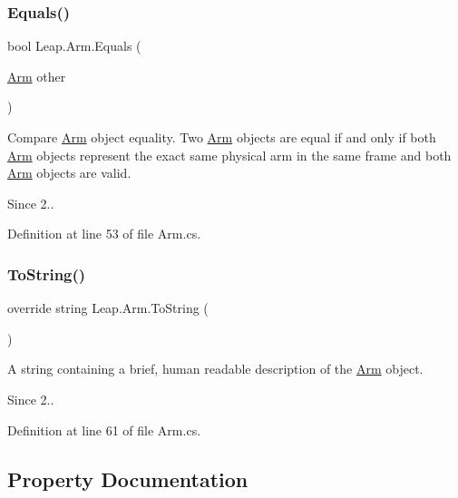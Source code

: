 \subsubsection{\texorpdfstring{Equals()}{Equals()}}
{\footnotesize\ttfamily bool Leap.\+Arm.\+Equals (\begin{DoxyParamCaption}\item[{\mbox{\hyperlink{class_leap_1_1_arm}{Arm}}}]{other }\end{DoxyParamCaption})}



Compare \mbox{\hyperlink{class_leap_1_1_arm}{Arm}} object equality. Two \mbox{\hyperlink{class_leap_1_1_arm}{Arm}} objects are equal if and only if both \mbox{\hyperlink{class_leap_1_1_arm}{Arm}} objects represent the exact same physical arm in the same frame and both \mbox{\hyperlink{class_leap_1_1_arm}{Arm}} objects are valid. 

\begin{DoxySince}{Since}
2.. 
\end{DoxySince}


Definition at line 53 of file Arm.\+cs.

\mbox{\label{class_leap_1_1_arm_a0fe227fe0db934b12c47b51ac41c2cfc}} 
\subsubsection{\texorpdfstring{ToString()}{ToString()}}
{\footnotesize\ttfamily override string Leap.\+Arm.\+To\+String (\begin{DoxyParamCaption}{ }\end{DoxyParamCaption})}



A string containing a brief, human readable description of the \mbox{\hyperlink{class_leap_1_1_arm}{Arm}} object. 

\begin{DoxySince}{Since}
2.. 
\end{DoxySince}


Definition at line 61 of file Arm.\+cs.



\subsection{Property Documentation}
\mbox{\label{class_leap_1_1_arm_a4249c0d34efeac222e96ba444bec5876}} 
